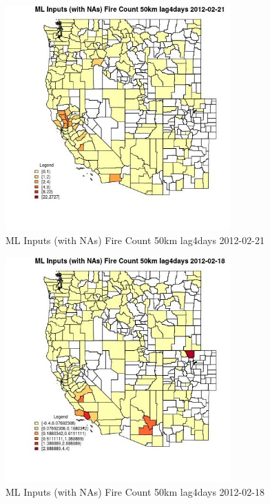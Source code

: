 \begin{figure} 
\centering  
\includegraphics[width=0.77\textwidth]{Code_Outputs/Report_ML_input_PM25_Step4_part_f_de_duplicated_aveswNAs_CountyFire_Count_50km_lag4daysMean2012-02-21.jpg} 
\caption{\label{fig:Report_ML_input_PM25_Step4_part_f_de_duplicated_aveswNAsCountyFire_Count_50km_lag4daysMean2012-02-21}ML Inputs (with NAs) Fire Count 50km lag4days 2012-02-21} 
\end{figure} 
 

\begin{figure} 
\centering  
\includegraphics[width=0.77\textwidth]{Code_Outputs/Report_ML_input_PM25_Step4_part_f_de_duplicated_aveswNAs_CountyFire_Count_50km_lag4daysMean2012-02-18.jpg} 
\caption{\label{fig:Report_ML_input_PM25_Step4_part_f_de_duplicated_aveswNAsCountyFire_Count_50km_lag4daysMean2012-02-18}ML Inputs (with NAs) Fire Count 50km lag4days 2012-02-18} 
\end{figure} 
 

